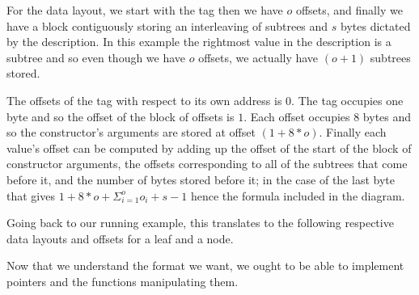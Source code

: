 For the data layout,
we start with the tag
then we have $o$ offsets,
and finally we have a block contiguously storing an interleaving of
subtrees and $s$ bytes
dictated by the description.
%
In this example the rightmost value in the description is a subtree and
so even though we have $o$ offsets, we actually have $(o+1)$ subtrees stored.

The offsets of the tag with respect to its own address is $0$.
The tag occupies one byte and so the offset of the block of offsets is $1$.
Each offset occupies 8 bytes and so the constructor's arguments are stored at offset $(1+8*o)$.
Finally each value's offset can be computed by adding up
the offset of the start of the block of constructor arguments,
the offsets corresponding to all of the subtrees that come before it,
and the number of bytes stored before it;
in the case of the last byte that gives $1+8*o + \Sigma_{i=1}^{o}o_i + s-1$
hence the formula included in the diagram.

Going back to our running example, this translates to the following
respective data layouts and offsets for a leaf and a node.

\begin{center}
  
\end{center}

Now that we understand the format we want, we ought to be able to implement pointers
and the functions manipulating them.
